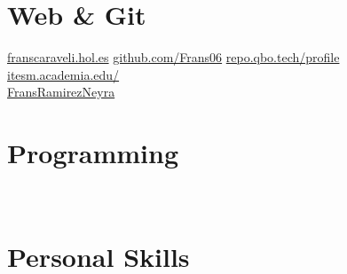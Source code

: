 \documentclass[]{friggeri-cv}
\begin{document}
\begin{aside}
  \section{Web \& Git}
    \href{http://fransramirez.hol.es}{franscaraveli.hol.es}
    \href{https://github.com/Frans06}{github.com/Frans06}
    \href{https://repo.qbo.tech:5443/profile}{repo.qbo.tech/profile}
    \href{https://itesm.academia.edu/FransRamirezNeyra}{itesm.academia.edu/\\FransRamirezNeyra}
    ~
  \section{Programming}
    ~
  \section{Personal Skills}
    ~
\end{aside}
~
\end{document}
